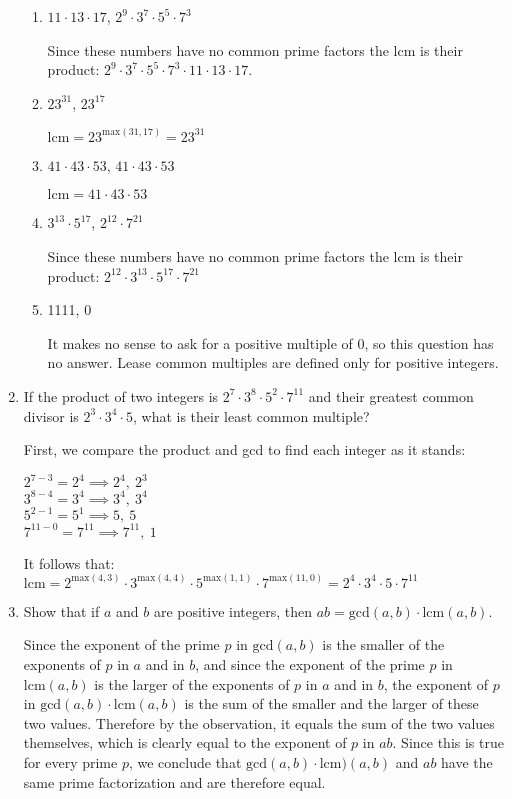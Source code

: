 \documentclass[11pt]{article}
\begin{document}
\begin{enumerate}[label=\textbf{\arabic*.}]
\begin{enumerate}[label=\textbf{\alph*)}]
		\item $11 \cdot 13 \cdot 17$, $2^9 \cdot 3^7 \cdot 5^5 \cdot 7^3$
		
		Since these numbers have no common prime factors the lcm is their product: $2^9 \cdot 3^7 \cdot 5^5 \cdot 7^3 \cdot 11 \cdot 13 \cdot 17$.
		
		\item $23^{31}$, $23^{17}$
		
		$\text{lcm} = 23^{\text{max}(31, 17)} = 23^{31}$
		
		\item $41 \cdot 43 \cdot 53$, $41 \cdot 43 \cdot 53$
		
		$\text{lcm} = 41 \cdot 43 \cdot 53$
		
		\item $3^{13} \cdot 5^{17}$, $2^{12} \cdot 7^{21}$
		
		Since these numbers have no common prime factors the lcm is their product: $2^{12} \cdot 3^{13} \cdot 5^{17} \cdot 7^{21}$
		
		\item 1111, 0
		
		It makes no sense to ask for a positive multiple of 0, so this question has no answer. Lease common multiples are defined only for positive integers.
	\end{enumerate}

	\item If the product of two integers is $2^7 \cdot 3^8 \cdot 5^2 \cdot 7^{11}$ and their greatest common divisor is $2^3 \cdot 3^4 \cdot 5$, what is their least common multiple?
	
	First, we compare the product and gcd to find each integer as it stands:
	
	$2^{7 - 3} = 2^4 \implies 2^4,\ 2^3$ \\
	$3^{8 - 4} = 3^4 \implies 3^4,\ 3^4$ \\
	$5^{2 - 1} = 5^1 \implies 5,\ 5$ \\
	$7^{11 - 0} = 7^{11} \implies 7^{11},\ 1$
	
	It follows that: $\text{lcm} = 2^{\text{max}(4, 3)} \cdot 3^{\text{max}(4, 4)} \cdot 5^{\text{max}(1, 1)} \cdot 7^{\text{max}(11, 0)} = 2^4 \cdot 3^4 \cdot 5 \cdot 7^{11}$
	
	\item Show that if $a$ and $b$ are positive integers, then $ab = \text{gcd}(a, b) \cdot \text{lcm}(a, b)$.
	
	Since the exponent of the prime $p$ in $\text{gcd}(a, b)$ is the smaller of the exponents of $p$ in $a$ and in $b$, and since the exponent of the prime $p$ in $\text{lcm}(a, b)$ is the larger of the exponents of $p$ in $a$ and in $b$, the exponent of $p$ in $\text{gcd}(a, b) \cdot \text{lcm}(a, b)$ is the sum of the smaller and the larger of these two values. Therefore by the observation, it equals the sum of the two values themselves, which is clearly equal to the exponent of $p$ in $ab$. Since this is true for every prime $p$, we conclude that $\text{gcd}(a, b) \cdot \text{lcm})(a, b)$ and $ab$ have the same prime factorization and are therefore equal.
	

\end{enumerate}
\end{document}
